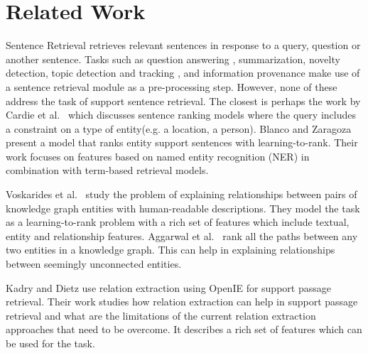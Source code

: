 \documentclass[sigconf]{acmart}
\begin{document}
\section{Related Work}
\label{sec:related work}
Sentence Retrieval retrieves relevant sentences in response to a query, question or another sentence. Tasks such as question answering \cite{cardie2000examining}, summarization, novelty detection, topic detection and tracking \cite{stokes2001first}, and information provenance make use of a sentence retrieval module as a pre-processing step. However, none of these address the task of support sentence retrieval. The closest is perhaps the work by Cardie et al.\ \cite{cardie2000examining} which discusses sentence ranking models where the query includes a constraint on a type of entity(e.g. a location, a person). 
Blanco and Zaragoza \cite{blanco2010finding} present a model that ranks entity support sentences with learning-to-rank. Their work focuses on features based on named entity recognition (NER) in combination with term-based retrieval models. 

Voskarides et al.\ \cite{voskarides2015learning} study the problem of explaining relationships between pairs of knowledge graph entities with human-readable descriptions. They model the task as a learning-to-rank problem with a rich set of features which include textual, entity and relationship features. Aggarwal et al.\ \cite{aggarwal2016connecting} rank all the paths between any two entities in a knowledge graph. This can help in explaining relationships between seemingly unconnected entities. 

Kadry and Dietz \cite{kadry2017open} use relation extraction using OpenIE for support passage retrieval. Their work studies how relation extraction can help in support passage retrieval and what are the limitations of the current relation extraction approaches that need to be overcome. It describes a rich set of features which can be used for the task.  
\end{document}
